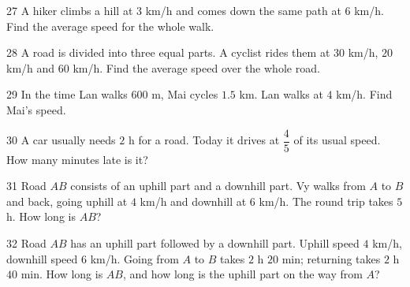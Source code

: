 \gap
\begin{probbox}{27}{\relax}
A hiker climbs a hill at $3$ km/h and comes down the same path at $6$ km/h. Find the average speed for the whole walk.
\end{probbox}
\gap
\begin{probbox}{28}{\relax}
A road is divided into three equal parts. A cyclist rides them at $30$ km/h, $20$ km/h and $60$ km/h. Find the average speed over the whole road.
\end{probbox}
\gap
\begin{probbox}{29}{\relax}
In the time Lan walks $600$ m, Mai cycles $1.5$ km. Lan walks at $4$ km/h. Find Mai's speed.
\end{probbox}
\gap
\begin{probbox}{30}{\relax}
A car usually needs $2$ h for a road. Today it drives at $\dfrac45$ of its usual speed. How many minutes late is it?
\end{probbox}
\begin{probbox}{31}{}
Road $AB$ consists of an uphill part and a downhill part. Vy walks from $A$ to $B$ and back, going uphill at $4$ km/h and downhill at $6$ km/h. The round trip takes $5$ h. How long is $AB$?
\end{probbox}
\gap
\begin{probbox}{32}{}
Road $AB$ has an uphill part followed by a downhill part. Uphill speed $4$ km/h, downhill speed $6$ km/h. Going from $A$ to $B$ takes $2$ h $20$ min; returning takes $2$ h $40$ min. How long is $AB$, and how long is the uphill part on the way from $A$?
\end{probbox}

